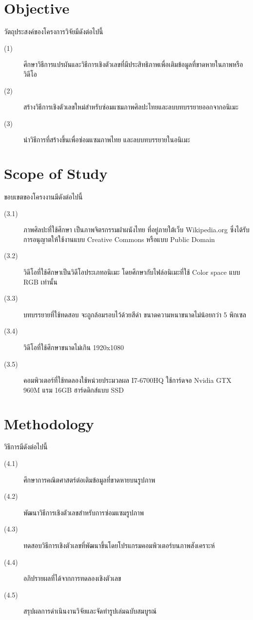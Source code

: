 \documentclass[hidelinks,a4paper,14pt]{article}
\numberwithin{equation}{section}							%
\begin{document}
{		%
\section{Objective}
วัตถุประสงค์ของโครงการวิจัยมีดังต่อไปนี้
\begin{description}
	\item[(1)]	 ศึกษาวิธีการแปรผันและวิธีการเชิงตัวเลขที่มีประสิทธิภาพเพื่อเติมข้อมูลที่ขาดหายในภาพหรือวิดีโอ
	\item[(2)] สร้างวิธีการเชิงตัวเลขใหม่สำหรับซ่อมแซมภาพศิลปะไทยและลบบทบรรยายออกจากอนิเมะ
	\item[(3)] นำวิธีการที่สร้างขึ้นเพื่อซ่อมแซมภาพไทย และลบบทบรรยายในอนิเมะ
\end{description}

\section{Scope of Study}
ขอบเขตของโครงงานมีดังต่อไปนี้
\begin{description}
\item[(3.1)] ภาพศิลปะที่ใช้ศึกษา เป็นภาพจิตรกรรมฝาผนังไทย ที่อยู่ภายใต้เว็บ Wikipedia.org ซึ่งได้รับการอนุญาตให้ใช้งานแบบ Creative Commons หรือแบบ Public Domain
\item[(3.2)] วิดีโอที่ใช้ศึกษาเป็นวิดีโอประเภทอนิเมะ โดยศึกษากับไฟล์อนิเมะที่ใช้ Color space แบบ RGB เท่านั้น
\item[(3.3)] บทบรรยายที่ใช้ทดสอบ จะถูกล้อมรอบไว้ด้วยสีดำ ขนาดความหนาขนาดไม่น้อยกว่า 5 พิกเซล
\item[(3.4)] วิดีโอที่ใช้ศึกษาขนาดไม่เกิน 1920x1080
\item[(3.5)] คอมพิวเตอร์ที่ใช้ทดลองใช้หน่วยประมวลผล I7-6700HQ ใช้การ์ดจอ Nvidia GTX 960M แรม 16GB ฮาร์ดดิกส์แบบ SSD
\end{description}

\section{Methodology}
วิธีการมีดังต่อไปนี้
\begin{description}
	\item[(4.1)] ศึกษาการคณิตศาสตร์ต่อเติมข้อมูลที่ขาดหายบนรูปภาพ
	\item[(4.2)] พัฒนาวิธีการเชิงตัวเลขสำหรับการซ่อมแซมรูปภาพ
	\item[(4.3)] ทดสอบวิธีการเชิงตัวเลขที่พัฒนาขึ้นโดยโปรแกรมคอมพิวเตอร์บนภาพสังเคราะห์
	\item[(4.4)] อภิปรายผลที่ได้จากการทดลองเชิงตัวเลข
	\item[(4.5)] สรุปผลการดำเนินงานวิจัยและจัดทำรูปเล่มฉบับสมบูรณ์
\end{description}
}
\end{document}
